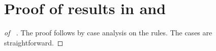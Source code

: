 \section{Proof of results in  and }


\begin{proof} [of ~]


The proof follows by case analysis on the rules. The cases are straightforward.

\end{proof}




			

				
		

